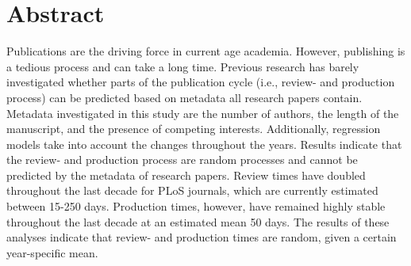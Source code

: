 \section*{Abstract}
Publications are the driving force in current age academia. However, publishing is a tedious process and can take a long time. Previous research has barely investigated whether parts of the publication cycle (i.e., review- and production process) can be predicted based on metadata all research papers contain. Metadata investigated in this study are the number of authors, the length of the manuscript, and the presence of competing interests. Additionally, regression models take into account the changes throughout the years. Results indicate that the review- and production process are random processes and cannot be predicted by the metadata of research papers. Review times have doubled throughout the last decade for PLoS journals, which are currently estimated between 15-250 days. Production times, however, have remained highly stable throughout the last decade at an estimated mean 50 days. The results of these analyses indicate that review- and production times are random, given a certain year-specific mean. 
  